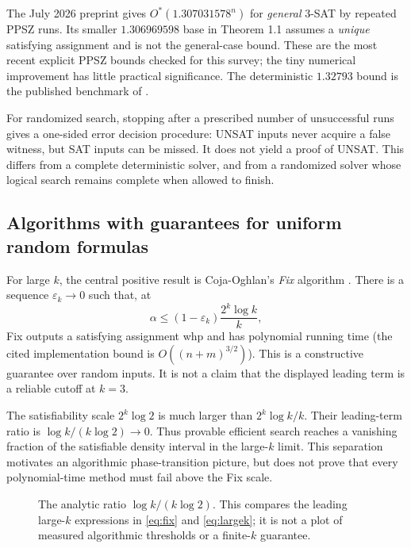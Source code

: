 The July 2026 preprint \citep[Corollary 1.2]{jiang2026} gives
$O^*(1.307031578^n)$ for \emph{general} $3$-SAT by repeated PPSZ runs.
Its smaller $1.306969598$ base in Theorem 1.1 assumes a \emph{unique}
satisfying assignment and is not the general-case bound. These are the
most recent explicit PPSZ bounds checked for this survey; the tiny numerical
improvement has little practical significance. The deterministic
$1.32793$ bound is the published benchmark of \citet{liu2018}.

For randomized search, stopping after a prescribed number of unsuccessful
runs gives a one-sided error decision procedure: UNSAT inputs never acquire
a false witness, but SAT inputs can be missed. It does not yield a proof of
UNSAT. This differs from a complete deterministic solver, and from a
randomized solver whose logical search remains complete when allowed to finish.

\subsection{Algorithms with guarantees for uniform random formulas}
For large $k$, the central positive result is Coja-Oghlan's \emph{Fix}
algorithm \citep[Theorem 1.1]{coja2010}. There is a sequence $\varepsilon_k\to0$
such that, at
\begin{equation}
 \alpha\le (1-\varepsilon_k)\frac{2^k\log k}{k},
 \label{eq:fix}
\end{equation}
Fix outputs a satisfying assignment whp and has polynomial running time
(the cited implementation bound is $O((n+m)^{3/2})$).
This is a constructive guarantee over random inputs. It is not a claim that
the displayed leading term is a reliable cutoff at $k=3$.

The satisfiability scale $2^k\log2$ is much larger than
$2^k\log k/k$. Their leading-term ratio is $\log k/(k\log2)\to0$.
Thus provable efficient search reaches a vanishing fraction of the
satisfiable density interval in the large-$k$ limit. This separation motivates
an algorithmic phase-transition picture, but does not prove that every
polynomial-time method must fail above the Fix scale.

\begin{figure}[htbp]
\centering
{}
\caption{The analytic ratio $\log k/(k\log2)$. This compares the leading
large-$k$ expressions in \eqref{eq:fix} and \eqref{eq:largek}; it is not a
plot of measured algorithmic thresholds or a finite-$k$ guarantee.}
\label{fig:gap}
\end{figure}

